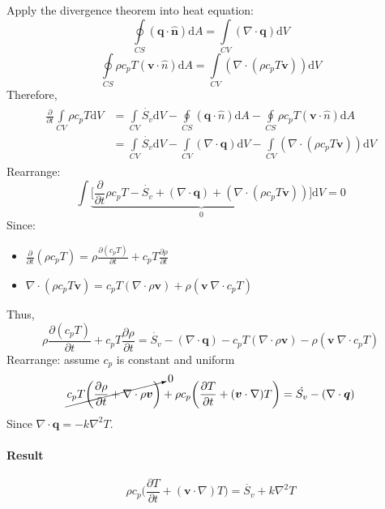 \documentclass[12pt, a4paper]{article}
\begin{document}
\begin{tcolorbox}[breakable, title = \textbf{Derivation}]
Apply the divergence theorem into heat equation:
\[ 
    \oint\limits_{CS} (\bm{q} \cdot \bm{\hat{n}}) \mathrm{d}A = \int\limits_{CV} (\nabla \cdot \bm{q}) \mathrm{d}V
\]
\[ 
    \oint\limits_{CS} \rho c_{p} T (\bm{v} \cdot \hat{n}) \mathrm{d}A =  \int\limits_{CV} (\nabla \cdot (\rho c_{p} T \bm{v})) \mathrm{d}V 
\]
Therefore,
\begin{align*}
\begin{split}
    \frac{\partial}{\partial t} \int\limits_{CV} \rho c_{p} T \mathrm{d}V 
    &= \int\limits_{CV} \dot{S_{v}} \mathrm{d}V - \oint\limits_{CS} (\bm{q} \cdot \hat{n}) \mathrm{d}A - \oint\limits_{CS} \rho c_{p} T (\bm{v} \cdot \hat{n}) \mathrm{d}A \\
    &= \int\limits_{CV} \dot{S_{v}} \mathrm{d}V - \int\limits_{CV} (\nabla \cdot \bm{q}) \mathrm{d}V - \int\limits_{CV} (\nabla \cdot (\rho c_{p} T \bm{v})) \mathrm{d}V 
\end{split}
\end{align*}
Rearrange:
\[ 
    \int \underbrace{\bigg[ \frac{\partial}{\partial t}\rho c_{p} T - \dot{S_{v}} + (\nabla \cdot \bm{q}) + (\nabla \cdot (\rho c_{p} T \bm{v})) \bigg]}_{0} \mathrm{d}V = 0 
\]
Since:
\begin{itemize}
    \item $\frac{\partial}{\partial t}(\rho c_{p} T) = \rho \frac{\partial (c_{p} T)}{\partial t} +  c_{p} T \frac{\partial  \rho}{\partial t}$
    \item $\nabla \cdot (\rho c_{p} T \bm{v} ) = c_{p} T(\nabla \cdot \rho \bm{v}) + \rho(\bm{v} \ \nabla \cdot c_{p} T) $ 
\end{itemize}
Thus,
\[ 
    \rho \frac{\partial (c_{p} T)}{\partial t} +  c_{p} T \frac{\partial  \rho}{\partial t} = \dot{S_{v}} -(\nabla \cdot \bm{q}) - c_{p} T(\nabla \cdot \rho \bm{v}) - \rho(\bm{v} \ \nabla \cdot c_{p} T) 
\]
Rearrange: assume $c_{p}$ is constant and uniform
\[ 
    \cancelto{0}{c_{p}T \bigg( \frac{\partial  \rho}{\partial t} + \nabla \cdot \rho \bm{v} \bigg)} + \rho c_{p} \bigg(\frac{\partial T}{\partial t} +(\bm{v} \cdot \nabla) T \bigg) = \dot{S_{v}} - (\nabla \cdot \bm{q}) 
\]
Since $\nabla \cdot \bm{q} = -k \nabla^{2} T$.
\paragraph{Result}
\[ 
    \rho c_{p}\bigg( \frac{\partial T}{\partial t} + (\bm{v} \cdot \nabla) T \bigg) = \dot{S_{v}}  +k \nabla^{2} T 
\]
\end{tcolorbox}
\end{document}

